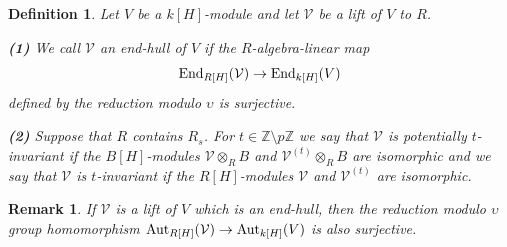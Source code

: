\documentclass[11pt]{amsart}
\newtheorem{definition}[theorem]{Definition}
\newtheorem{remark}[theorem]{Remark}
\def\Aut{\textup{Aut}}
\def\End{\textup{End}}
\begin{document}
\begin{definition}\label{D3}
Let $V$ be a $k[H]$-module and let $\mathcal V$ be a lift of $V$ to $R$. 

\medskip
{\bf (1)} We call $\mathcal V$ an end-hull of $V$ if the $R$-algebra-linear map 
$$\End_{R[H]}(\mathcal V)\rightarrow\End_{k[H]}(V)$$ 
defined by the reduction modulo $\upsilon$ is surjective.

\smallskip
{\bf (2)} Suppose that $R$ contains $R_s$. For $t\in\mathbb Z\setminus p\mathbb Z$ we say that $\mathcal V$ is potentially $t$-invariant if the $B[H]$-modules $\mathcal V\otimes_R B$ and $\mathcal V^{(t)}\otimes_R B$ are isomorphic and we say that $\mathcal V$ is $t$-invariant if the $R[H]$-modules $\mathcal V$ and $\mathcal V^{(t)}$ are isomorphic.
\end{definition}

\begin{remark}\normalfont\label{R2}
If $\mathcal V$ is a lift of $V$ which is an end-hull, then the reduction modulo $\upsilon$  group homomorphism $\Aut_{R[H]}(\mathcal V)\rightarrow\Aut_{k[H]}(V)$ is also surjective.
\end{remark}
\end{document}
